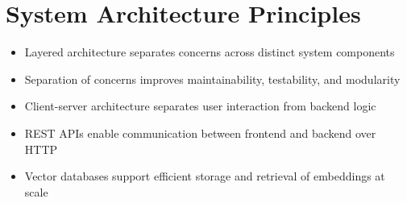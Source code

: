 \section{System Architecture Principles}
\begin{itemize}
    \item Layered architecture separates concerns across distinct 
    system components
    \item Separation of concerns improves maintainability, 
    testability, and modularity
    \item Client-server architecture separates user interaction 
    from backend logic
    \item REST APIs enable communication between frontend 
    and backend over HTTP
    \item Vector databases support efficient storage and retrieval 
    of embeddings at scale
\end{itemize}